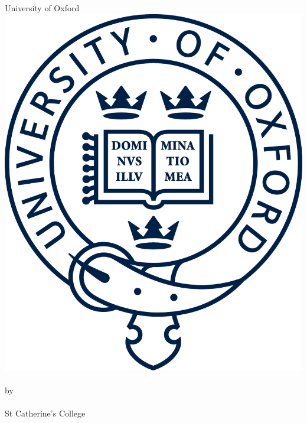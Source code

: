 \documentclass[a4paper,11pt,openany,extrafontsizes]{memoir}
\begin{document}
\pagestyle{plain}
\tightlists%

\begin{titlingpage}
  \begin{center}
    \vspace{1cm}
    \textsf{\Huge{University of Oxford}}\\
    \vspace{1cm}
    \includegraphics{branding/beltcrest.png}\\
    \vspace{2cm}
    \Huge{\thetitle}\\
    \vspace{2cm}
    \large{by\\[14pt]\theauthor\\[8pt]St Catherine's College}
    \vfill

\end{center}
\end{titlingpage}
\end{document}
